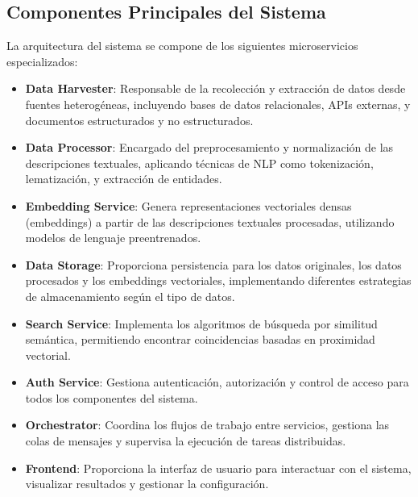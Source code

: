 \documentclass[12pt,a4paper]{article}
\begin{document}
\subsection{Componentes Principales del Sistema}
\label{subsec:componentes-principales}

La arquitectura del sistema se compone de los siguientes microservicios especializados:

\begin{itemize}
    \item \textbf{Data Harvester}: Responsable de la recolección y extracción de datos desde fuentes heterogéneas, incluyendo bases de datos relacionales, APIs externas, y documentos estructurados y no estructurados.
    
    \item \textbf{Data Processor}: Encargado del preprocesamiento y normalización de las descripciones textuales, aplicando técnicas de NLP como tokenización, lematización, y extracción de entidades.
    
    \item \textbf{Embedding Service}: Genera representaciones vectoriales densas (embeddings) a partir de las descripciones textuales procesadas, utilizando modelos de lenguaje preentrenados.
    
    \item \textbf{Data Storage}: Proporciona persistencia para los datos originales, los datos procesados y los embeddings vectoriales, implementando diferentes estrategias de almacenamiento según el tipo de datos.
    
    \item \textbf{Search Service}: Implementa los algoritmos de búsqueda por similitud semántica, permitiendo encontrar coincidencias basadas en proximidad vectorial.
    
    \item \textbf{Auth Service}: Gestiona autenticación, autorización y control de acceso para todos los componentes del sistema.
    
    \item \textbf{Orchestrator}: Coordina los flujos de trabajo entre servicios, gestiona las colas de mensajes y supervisa la ejecución de tareas distribuidas.
    
    \item \textbf{Frontend}: Proporciona la interfaz de usuario para interactuar con el sistema, visualizar resultados y gestionar la configuración.
\end{itemize}
\end{document}
